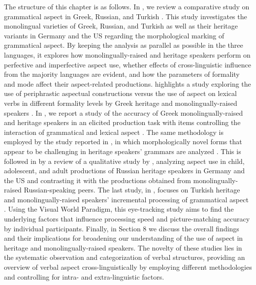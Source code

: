 \documentclass[output=paper,colorlinks,citecolor=brown]{langscibook}
\begin{document}
The structure of this chapter is as follows. In , we review a comparative study on grammatical aspect in Greek, Russian, and Turkish \parencite{RizouEtAl}. This study investigates the monolingual varieties of Greek, Russian, and Turkish as well as their heritage variants in Germany and the US regarding the morphological marking of grammatical aspect.
By keeping the analysis as parallel as possible in the three languages, it explores how monolingually-raised and heritage speakers perform on perfective and imperfective aspect use, whether effects of cross-linguistic influence from the majority languages are evident, and how the parameters of formality and mode affect their aspect-related productions.
 highlights a study exploring the use of periphrastic aspectual constructions versus the use of aspect on lexical verbs in different formality levels by Greek heritage and monolingually-raised speakers \parencite{alexiadou2022use}. In , we report a study of the accuracy of Greek monolingually-raised and heritage speakers in an elicited production task with items controlling the interaction of grammatical and lexical aspect \parencite{rizou2021verbal}.
The same methodology is employed by the study reported in , in which morphologically novel forms that appear to be challenging in heritage speakers' grammars are analyzed \parencite{novelforms}.
This is followed in  by a review of a qualitative study by \textcite{gagarina2020first}, analyzing aspect use in child, adolescent, and adult productions of Russian heritage speakers in Germany and the US and contrasting it with the productions obtained from monolingually-raised Russian-speaking peers. 
The last study, in , focuses on Turkish heritage and monolingually-raised speakers' incremental processing of grammatical aspect \parencite{Ozsoy_2023, Ozsoy_2024}. Using the Visual World Paradigm, this eye-tracking study aims to find the underlying factors that influence processing speed and picture-matching accuracy by individual participants.
Finally, in Section 8 we discuss the overall findings and their implications for broadening our understanding of the use of aspect in heritage and monolingually-raised speakers. The novelty of these studies lies in the systematic observation and categorization of verbal structures, providing an overview of verbal aspect cross-linguistically by employing different methodologies and controlling for intra- and extra-linguistic factors. 
\end{document}
